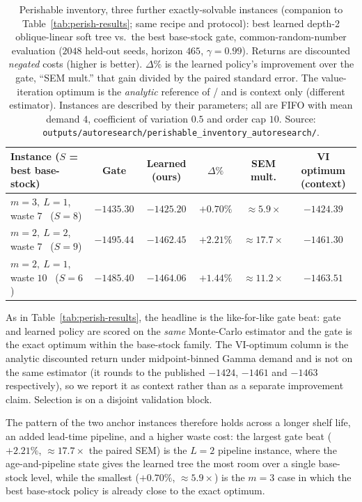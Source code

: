 \begin{table}[!htbp]
\centering
\small
\caption{Perishable inventory, three further exactly-solvable instances (companion to
Table~\ref{tab:perish-results}; same recipe and protocol): best learned depth-2 oblique-linear
soft tree vs.\ the best base-stock gate, common-random-number evaluation ($2048$ held-out seeds,
horizon $465$, $\gamma=0.99$). Returns are discounted \emph{negated} costs (higher is better).
$\Delta\%$ is the learned policy's improvement over the gate, ``SEM mult.'' that gain divided by
the paired standard error. The value-iteration optimum is the \emph{analytic} reference of
\citet{deMoor2022perishable} / \citet{farrington2025perishable} and is context only (different
estimator). Instances are described by their parameters; all are FIFO with mean demand $4$,
coefficient of variation $0.5$ and order cap $10$. Source:
\texttt{outputs/autoresearch/perishable\_inventory\_autoresearch/}.}
\label{tab:perish-results-more}
\begin{tabular}{lccccc}
\toprule
Instance ($S$ = best base-stock) & Gate & Learned (ours) & $\Delta\%$ & SEM mult. & VI optimum (context) \\
\midrule
$m=3,\ L=1$, waste $7$ \ ($S=8$)            & $-1435.30$ & $\mathbf{-1425.20}$ & $\mathbf{+0.70\%}$ & $\approx 5.9\times$  & $-1424.39$ \\
$m=2,\ L=2$, waste $7$ \ ($S=9$)            & $-1495.44$ & $\mathbf{-1462.45}$ & $\mathbf{+2.21\%}$ & $\approx 17.7\times$ & $-1461.30$ \\
$m=2,\ L=1$, waste $10$ \ ($S=6$)           & $-1485.40$ & $\mathbf{-1464.06}$ & $\mathbf{+1.44\%}$ & $\approx 11.2\times$ & $-1463.51$ \\
\bottomrule
\end{tabular}
\par\medskip\footnotesize As in Table~\ref{tab:perish-results}, the headline is the like-for-like
gate beat: gate and learned policy are scored on the \emph{same} Monte-Carlo estimator and the gate
is the exact optimum within the base-stock family. The VI-optimum column is the analytic discounted
return under midpoint-binned Gamma demand and is not on the same estimator (it rounds to the published
$-1424$, $-1461$ and $-1463$ respectively), so we report it as context rather than as a separate
improvement claim. Selection is on a disjoint validation block.
\end{table}
\FloatBarrier

\noindent
The pattern of the two anchor instances therefore holds across a longer shelf life, an added lead-time
pipeline, and a higher waste cost: the largest gate beat ($+2.21\%$, $\approx17.7\times$ the paired SEM)
is the $L=2$ pipeline instance, where the age-and-pipeline state gives the learned tree the most room
over a single base-stock level, while the smallest ($+0.70\%$, $\approx5.9\times$) is the $m=3$ case in
which the best base-stock policy is already close to the exact optimum.
